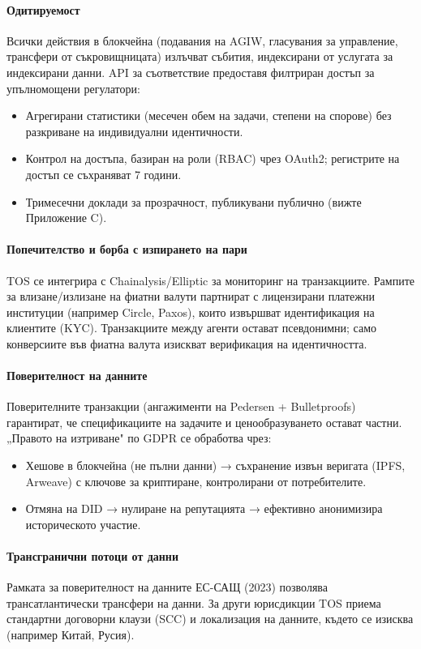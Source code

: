 \documentclass[11pt]{article}
\begin{document}
\paragraph{Одитируемост}
Всички действия в блокчейна (подавания на AGIW, гласувания за управление, трансфери от съкровищницата) излъчват събития, индексирани от услугата за индексирани данни. API за съответствие предоставя филтриран достъп за упълномощени регулатори:
\begin{itemize}[noitemsep]
  \item Агрегирани статистики (месечен обем на задачи, степени на спорове) без разкриване на индивидуални идентичности.
  \item Контрол на достъпа, базиран на роли (RBAC) чрез OAuth2; регистрите на достъп се съхраняват 7 години.
  \item Тримесечни доклади за прозрачност, публикувани публично (вижте Приложение C).
\end{itemize}

\paragraph{Попечителство и борба с изпирането на пари}
TOS се интегрира с Chainalysis/Elliptic за мониторинг на транзакциите. Рампите за влизане/излизане на фиатни валути партнират с лицензирани платежни институции (например Circle, Paxos), които извършват идентификация на клиентите (KYC). Транзакциите между агенти остават псевдонимни; само конверсиите във фиатна валута изискват верификация на идентичността.

\paragraph{Поверителност на данните}
Поверителните транзакции (ангажименти на Pedersen + Bulletproofs) гарантират, че спецификациите на задачите и ценообразуването остават частни. „Правото на изтриване" по GDPR се обработва чрез:
\begin{itemize}[noitemsep]
  \item Хешове в блокчейна (не пълни данни) → съхранение извън веригата (IPFS, Arweave) с ключове за криптиране, контролирани от потребителите.
  \item Отмяна на DID → нулиране на репутацията → ефективно анонимизира историческото участие.
\end{itemize}

\paragraph{Трансгранични потоци от данни}
Рамката за поверителност на данните ЕС-САЩ (2023) позволява трансатлантически трансфери на данни. За други юрисдикции TOS приема стандартни договорни клаузи (SCC) и локализация на данните, където се изисква (например Китай, Русия).
\end{document}

